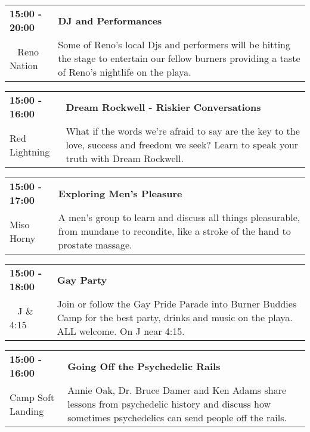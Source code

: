 \begin{tabular}{ p{1in} p{2.2in} }
    \textbf{15:00 - 20:00} & \textbf{DJ and Performances} \\
    ~ \newline Reno Nation & Some of Reno's local Djs and performers will be hitting the stage to entertain our fellow burners providing a taste of Reno's nightlife on the playa. \\
    \hline 
\end{tabular}
    
\begin{tabular}{ p{1in} p{2.2in} }
    \textbf{15:00 - 16:00} & \textbf{Dream Rockwell - Riskier Conversations} \\
    Red Lightning \newline  & What if the words we're afraid to say are the key to the love, success and freedom we seek? Learn to speak your truth with Dream Rockwell. \\
    \hline 
\end{tabular}
    
\begin{tabular}{ p{1in} p{2.2in} }
    \textbf{15:00 - 17:00} & \textbf{Exploring Men's Pleasure} \\
    Miso Horny \newline  & A men's group to learn and discuss all things pleasurable, from mundane to recondite, like a stroke of the hand to prostate massage. \\
    \hline 
\end{tabular}
    
\begin{tabular}{ p{1in} p{2.2in} }
    \textbf{15:00 - 18:00} & \textbf{Gay Party} \\
    ~ \newline J \& 4:15 & Join or follow the Gay Pride Parade into Burner Buddies Camp for the best party, drinks and music on the playa. ALL welcome. On J near 4:15. \\
    \hline 
\end{tabular}
    
\begin{tabular}{ p{1in} p{2.2in} }
    \textbf{15:00 - 16:00} & \textbf{Going Off the Psychedelic Rails} \\
    Camp Soft Landing \newline  & Annie Oak, Dr. Bruce Damer and Ken Adams share lessons from psychedelic history and discuss how sometimes psychedelics can send people off the rails. \\
    \hline 
\end{tabular}
    
